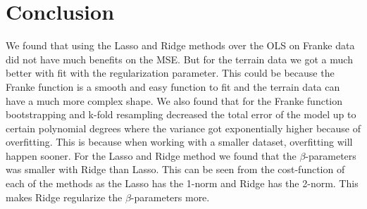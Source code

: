 \section{Conclusion}



We found that using the Lasso and Ridge methods over the OLS on Franke data did not have much benefits on the MSE. But for the terrain data we got a much better with fit with the regularization parameter. This could be because the Franke function is a smooth and easy function to fit and the terrain data can have a much more complex shape. We also found that for the Franke function bootstrapping and k-fold resampling decreased the total error of the model up to certain polynomial degrees where the variance got exponentially higher because of overfitting. This is because when working with a smaller dataset, overfitting will happen sooner. For the Lasso and Ridge method we found that the $\beta$-parameters was smaller with Ridge than Lasso. This can be seen from the cost-function of each of the methods as the Lasso has the 1-norm and Ridge has the 2-norm. This makes Ridge regularize the $\beta$-parameters more.
